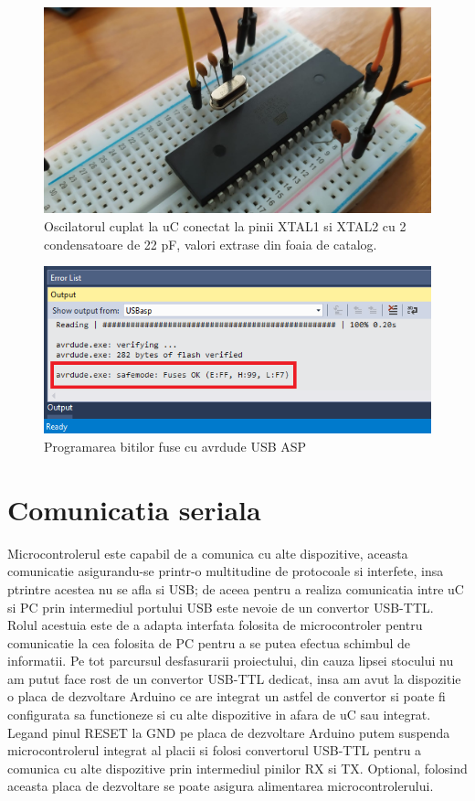 \documentclass[12pt]{article}
\begin{document}
\begin{figure}[H]
\centering
\includegraphics[width=\textwidth]{Pictures/osc.jpeg}
\caption{Oscilatorul cuplat la uC conectat la pinii XTAL1 si XTAL2 cu 2 condensatoare de 22 pF, valori extrase din foaia de catalog.}
\end{figure}

\begin{figure}[H]
\centering
\includegraphics[width=\textwidth]{Pictures/fuse.png}
\caption{Programarea bitilor fuse cu avrdude USB ASP}
\end{figure}

\newpage


\section{Comunicatia seriala}
\hspace{8 mm} Microcontrolerul este capabil de a comunica cu alte dispozitive, aceasta comunicatie asigurandu-se printr-o multitudine de protocoale si interfete, insa ptrintre acestea nu se afla si USB; de aceea pentru a realiza comunicatia intre uC si PC prin intermediul portului USB este nevoie de un convertor USB-TTL. Rolul acestuia este de a adapta interfata folosita de microcontroler pentru comunicatie la cea folosita de PC pentru a se putea efectua schimbul de informatii. Pe tot parcursul desfasurarii proiectului, din cauza lipsei stocului nu am putut face rost de un convertor USB-TTL dedicat, insa am avut la dispozitie o placa de dezvoltare Arduino ce are integrat un astfel de convertor si poate fi configurata sa functioneze si cu alte dispozitive in afara de uC sau integrat. Legand pinul RESET la GND pe placa de dezvoltare Arduino putem suspenda microcontrolerul integrat al placii si folosi convertorul USB-TTL pentru a comunica cu alte dispozitive prin intermediul pinilor RX si TX. Optional, folosind aceasta placa de dezvoltare se poate asigura alimentarea microcontrolerului.
\end{document}
